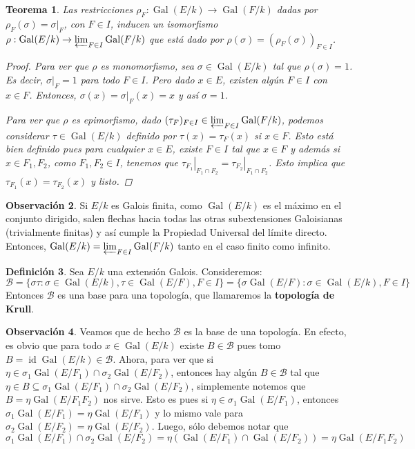 \documentclass[12pt]{book}
\newtheorem{teo}{Teorema}[section]
\theoremstyle{definition}
\newtheorem{obs}[teo]{Observación}
\newtheorem{defn}[teo]{Definición}
\DeclareMathOperator{\id}{id}
\DeclareMathOperator{\Gal}{Gal}
\begin{document}
\begin{teo}
Las restricciones $\rho_F:\Gal(E/k)\to \Gal(F/k)$ dadas por $\rho_F(\sigma) = \left.\sigma\right|_{F}$, con $F\in I$, inducen un isomorfismo $\rho:\Gal(E/k)\to\varprojlim_{F\in I} \Gal(F/k)$ que está dado por $\rho(\sigma) = (\rho_F(\sigma))_{F\in I}$.
\begin{proof}
Para ver que $\rho$ es monomorfismo, sea $\sigma\in\Gal(E/k)$ tal que $\rho(\sigma)=1$. Es decir, $\left.\sigma\right|_{F}=1$ para todo $F\in I$. Pero dado $x\in E$, existen algún $F\in I$ con $x\in F$. Entonces, $\sigma(x) = \left.\sigma\right|_F(x) = x$ y así $\sigma=1$.

Para ver que $\rho$ es epimorfismo, dado $(\tau_F)_{F\in I}\in\varprojlim_{F\in I}\Gal(F/k)$, podemos considerar $\tau\in\Gal(E/k)$ definido por $\tau(x)=\tau_F(x)$ si $x\in F$. Esto está bien definido pues para cualquier $x\in E$, existe $F\in I$ tal que $x\in F$ y además si $x\in F_1,F_2$, como $F_1,F_2\in I$, tenemos que $\left.\tau_{F_1}\right|_{F_1\cap F_2} = \left.\tau_{F_2}\right|_{F_1\cap F_2}$. Esto implica que $\tau_{F_1}(x)=\tau_{F_2}(x)$ y listo.
\end{proof}
\end{teo}

\begin{obs}
Si $E/k$ es Galois finita, como $\Gal(E/k)$ es el máximo en el conjunto dirigido, salen flechas hacia todas las otras subextensiones Galoisianas (trivialmente finitas) y así cumple la Propiedad Universal del límite directo. Entonces, $\Gal(E/k)=\varprojlim_{F\in I} \Gal(F/k)$ tanto en el caso finito como infinito.
\end{obs}

\begin{defn}
Sea $E/k$ una extensión Galois. Consideremos: $$\mathscr{B}=\{\sigma\tau : \sigma\in\Gal(E/k),\tau\in\Gal(E/F), F\in I\} = \{\sigma\Gal(E/F):\sigma\in\Gal(E/k),F\in I\}$$ Entonces $\mathscr{B}$ es una base para una topología, que llamaremos la \textbf{topología de Krull}.
\end{defn}

\begin{obs}
Veamos que de hecho $\mathscr{B}$ es la base de una topología. En efecto, es obvio que para todo $x\in\Gal(E/k)$ existe $B\in\mathscr{B}$ pues tomo $B=\id\Gal(E/k)\in\mathscr{B}$. Ahora, para ver que si $\eta\in\sigma_1\Gal(E/F_1)\cap\sigma_2\Gal(E/F_2)$, entonces hay algún $B\in \mathscr{B}$ tal que $\eta\in B\subseteq \sigma_1\Gal(E/F_1)\cap\sigma_2\Gal(E/F_2)$, simplemente notemos que $B=\eta\Gal(E/F_1F_2)$ nos sirve. Esto es pues si $\eta\in \sigma_1\Gal(E/F_1)$, entonces $\sigma_1\Gal(E/F_1) = \eta\Gal(E/F_1)$ y lo mismo vale para $\sigma_2\Gal(E/F_2)=\eta\Gal(E/F_2)$. Luego, sólo debemos notar que $$\sigma_1\Gal(E/F_1)\cap\sigma_2\Gal(E/F_2) = \eta (\Gal(E/F_1)\cap\Gal(E/F_2)) = \eta \Gal(E/F_1F_2)$$
\end{obs}
\end{document}

